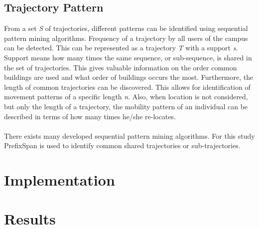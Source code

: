 \subsection{Trajectory Pattern}
From a set \textit{S} of trajectories, different patterns can be identified using sequential pattern mining algorithms. Frequency of a trajectory by all users of the campus can be detected. This can be represented as a trajectory \textit{T} with a support \textit{s}. Support means how many times the same sequence, or sub-sequence, is shared in the set of trajectories. This gives valuable information on the order common buildings are used and what order of buildings occurs the most. Furthermore, the length of common trajectories can be discovered. This allows for identification of movement patterns of a specific length \textit{n}. Also, when location is not considered, but only the length of a trajectory, the mobility pattern of an individual can be described in terms of how many times he/she re-locates. \\\\
There exists many developed sequential pattern mining algorithms. For this study PrefixSpan \cite{pei2004mining} is used to identify common shared trajectories or sub-trajectories. 
\section{Implementation}
\section{Results}





